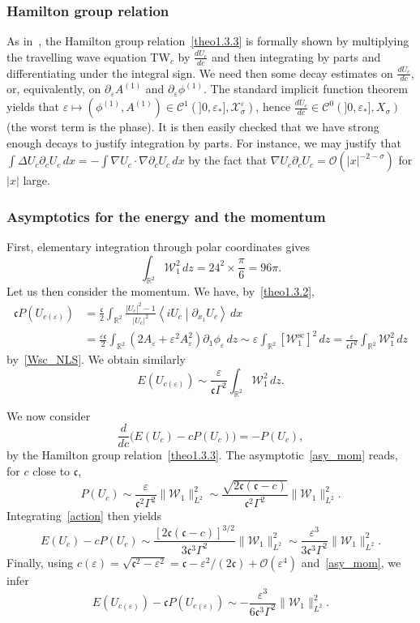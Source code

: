 \documentclass[10pt]{amsart}
\theoremstyle{definition}\newtheorem{defi}[theo]{Definition}\newtheorem{rema}[theo]{Remark}\newtheorem{exam}[theo]{Example}\newtheorem{exem}[theo]{Example}\newtheorem{nota}[theo]{Notation}
\newcommand*\p{\partial}
\newcommand*\R{\mathbb R}
\renewcommand{\sc}{\mathrm{sc}}
\newcommand*\BO{\mathcal{O}}
\newcommand*\BC{\mathcal{C}}
\newcommand*\BW{\mathcal{W}}
\newcommand*\BX{\mathcal{X}}
\newcommand*\cs{{\mathfrak c}}
\newcommand*\e{\varepsilon}
\newcommand*\s{\sigma}
\begin{document}
\subsubsection{Hamilton group relation}

As in~\cite{JR}, the Hamilton group relation~\eqref{theo1.3.3} is formally shown by multiplying the travelling wave equation TW$_c$ by $ \frac{d U_c}{dc} $ and then integrating by parts and differentiating under the integral sign. We need then some decay estimates on $ \frac{d U_c}{dc} $, or, equivalently, on $ \p_\e A^{(1)} $ and $ \p_\e \phi^{(1)} $. The standard implicit function theorem yields that $ \e \mapsto (\phi^{(1)}, A^{(1)}) \in \BC^1 (]0,\e_*], \BX^\e_\s) $, hence $ \frac{d U_c}{dc} \in \BC^0 (]0,\e_*], X_\s) $ (the worst term is the phase). It is then easily checked that we have strong enough decays to justify integration by parts. For instance, we may justify that $ \int \Delta U_c \p_c U_c \, dx = - \int \nabla U_c \cdot \nabla \p_c U_c \, dx $ by the fact that $ \nabla U_c \p_c U_c = \BO (|x|^{- 2- \s}) $ for $|x| $ large.



\subsubsection{Asymptotics for the energy and the momentum}

First, elementary integration through polar coordinates gives
\[
\int_{\R^2} \BW_1^2 \, dz = 24^2 \times \frac{\pi}{6} = 96 \pi.
\]
Let us then consider the momentum. We have, by~\eqref{theo1.3.2},
\begin{equation}\label{asy_mom}
\begin{split}
\cs P(U_{c(\e)}) & = \frac{\cs}{2} \int_{\R^2} \frac{ \lvert U_c \rvert^2 - 1 }{ \lvert U_c \rvert^2 } \left\langle i U_c \middle| \p_{x_1} U_c \right\rangle \, dx
 \\ & = \frac{ \e \cs}{2} \int_{\R^2} \left(2 A_\e + \e^2 A_\e^2\right) \p_1 \phi_\e \, dz
\sim \e \int_{\R^2} \left[\BW_1^{\sc}\right]^2 \, dz = \frac{\e }{\cs \Gamma^2 } \int_{\R^2} \BW_1^2 \, dz
\end{split}
\end{equation}
by~\eqref{Wsc_NLS}. We obtain similarly
\[
E(U_{c(\e)}) \sim \frac{\e }{\cs \Gamma^2 } \int_{\R^2} \BW_1^2 \, dz.
\]


We now consider
\begin{equation}\label{action}
\frac{d}{dc} \big(E(U_c) - c P(U_c) \big) = - P(U_c),
\end{equation}
by the Hamilton group relation~\eqref{theo1.3.3}. The asymptotic~\eqref{asy_mom} reads, for $c $ close to $ \cs $,
\[
P(U_{c}) \sim \frac{ \e }{\cs^2 \Gamma^2 } \| \BW_1 \|_{L^2}^2
\sim \frac{ \sqrt{ 2\cs (\cs - c)} }{ \cs^2 \Gamma^2 } \| \BW_1 \|_{L^2}^2.
\]
Integrating~\eqref{action} then yields
\[
E(U_c) - c P(U_c)
\sim \frac{ [2\cs (\cs - c)]^{3/2} }{ 3 \cs^3 \Gamma^2 } \| \BW_1 \|_{L^2}^2
\sim \frac{ \e^{3} }{ 3 \cs^3 \Gamma^2 } \| \BW_1 \|_{L^2}^2.
\]
Finally, using $ c(\e) = \sqrt{ \cs^2 - \e^2 } = \cs - \e^2 /(2\cs) + \BO(\e^4) $ and~\eqref{asy_mom}, we infer
\[
E(U_{c(\e)}) - \cs P (U_{c(\e)})
\sim - \frac{\e^3}{6 \cs^3 \Gamma^2} \| \BW_1 \|_{L^2}^2.
\]
\end{document}
